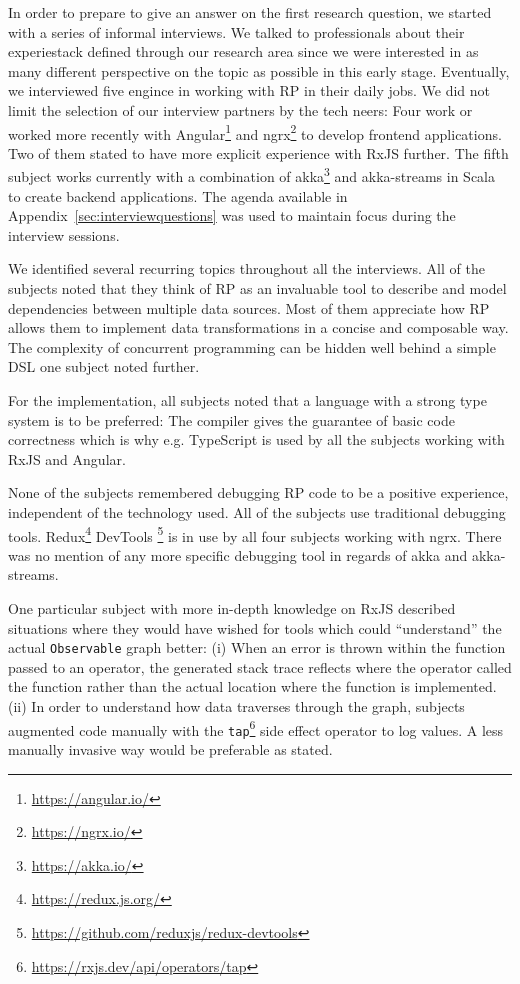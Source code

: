 \documentclass[12pt,a4paper]{article}
\begin{document}
In order to prepare to give an answer on the first research question, we started with a series of informal interviews. We talked to professionals about their experiestack defined through our research area since we were interested in as many different perspective on the topic as possible in this early stage. Eventually, we interviewed five engince in working with RP in their daily jobs. We did not limit the selection of our interview partners by the tech neers: Four work or worked more recently with Angular\footnote{\url{https://angular.io/}} and ngrx\footnote{\url{https://ngrx.io/}} to develop frontend applications. Two of them stated to have more explicit experience with RxJS further. The fifth subject works currently with a combination of akka\footnote{\url{https://akka.io/}} and akka-streams in Scala to create backend applications. The agenda available in Appendix~\ref{sec:interviewquestions} was used to maintain focus during the interview sessions.

We identified several recurring topics throughout all the interviews. All of the subjects noted that they think of RP as an invaluable tool to describe and model dependencies between multiple data sources. Most of them appreciate how RP allows them to implement data transformations in a concise and composable way. The complexity of concurrent programming can be hidden well behind a simple DSL one subject noted further.

For the implementation, all subjects noted that a language with a strong type system is to be preferred: The compiler gives the guarantee of basic code correctness which is why e.g. TypeScript is used by all the subjects working with RxJS and Angular.

None of the subjects remembered debugging RP code to be a positive experience, independent of the technology used. All of the subjects use traditional debugging tools. Redux\footnote{\url{https://redux.js.org/}} DevTools \footnote{\url{https://github.com/reduxjs/redux-devtools}} is in use by all four subjects working with ngrx. There was no mention of any more specific debugging tool in regards of akka and akka-streams.

One particular subject with more in-depth knowledge on RxJS described situations where they would have wished for tools which could ``understand'' the actual \texttt{Observable} graph better: (i) When an error is thrown within the function passed to an operator, the generated stack trace reflects where the operator called the function rather than the actual location where the function is implemented. (ii) In order to understand how data traverses through the graph, subjects augmented code manually with the \texttt{tap}\footnote{\url{https://rxjs.dev/api/operators/tap}} side effect operator to log values. A less manually invasive way would be preferable as stated.
\end{document}
